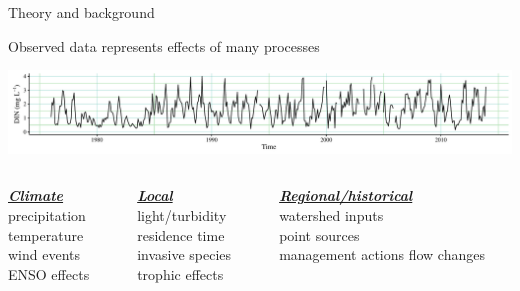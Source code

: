 \documentclass[xcolor=dvipsnames,serif]{beamer}\usepackage[]{graphicx}\usepackage[]{color}
\newcommand{\Bigtxt}[1]{\textbf{\textit{#1}}}
\begin{document}
\begin{frame}[t]{Theory and background}{}
{\bf \centerline{Observed data represents effects of many processes}}
\vspace{0.15in}
\centerline{\includegraphics[width = \textwidth]{imgs/ts_ex.pdf}}
\vspace{0.15in}
\begin{columns}[t]
\begin{column}{0.3\textwidth}
{\bf \underline{\Bigtxt{Climate}}}\\
precipitation\\
temperature\\
wind events\\
ENSO effects
\end{column}
\begin{column}{0.3\textwidth}
{\bf \underline{\Bigtxt{Local}}}\\
light/turbidity\\
residence time\\
invasive species\\
trophic effects
\end{column}
\begin{column}{0.3\textwidth}
{\bf \underline{\Bigtxt{Regional/historical}}}\\
watershed inputs\\
point sources\\
management actions
flow changes
\end{column}
\end{columns}
\end{frame}
\end{document}
